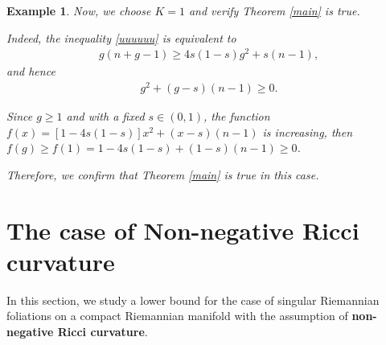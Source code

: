 \documentclass[11pt]{amsart}
\newtheorem{theorem}{Theorem}[section]
\newtheorem{example}{Example}
\def\d{\mathrm{d}}
\begin{document}
\begin{example}
    Now, we choose $K=1$ and verify Theorem \ref{main} is true.

    Indeed, the inequality \ref{uuuuuu} is equivalent to
    \begin{align*}
        g(n+g-1)\geq 4s(1-s)g^2+s(n-1),
    \end{align*}and hence
    \begin{align*}
        [1-4s(1-s)]g^2+(g-s)(n-1)\geq 0.
    \end{align*}

    Since $g\geq 1$ and with a fixed $s\in (0,1)$, the function $f(x)=[1-4s(1-s)]x^2+(x-s)(n-1)$ is increasing, then $f(g)\geq f(1)=1-4s(1-s)+(1-s)(n-1)\geq 0$.

    Therefore, we confirm that Theorem \ref{main} is true in this case.
\end{example}


\section{The case of Non-negative Ricci curvature}\label{7777}

In this section, we study a lower bound for the case of singular Riemannian foliations on a compact Riemannian manifold with the assumption of \textbf{non-negative Ricci curvature}. 



\end{document}
